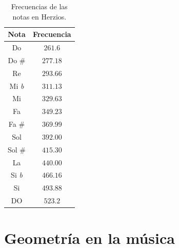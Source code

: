 \documentclass[a4paper, openright, 11pt, titlepage]{report}
\theoremstyle{definition}\newtheorem{defin}[propo]{Definition}
\theoremstyle{definition}\newtheorem{obser}[propo]{Remark}
\theoremstyle{definition}\newtheorem{ejem}[propo]{Ejemplo}
\theoremstyle{definition}\newtheorem{algoritmo}[propo]{Algoritmo}
\begin{document}
\begin{table}[H]
    \centering
    \begin{tabular}{|c|c|}
    \hline
    Nota & Frecuencia\\
    \hline \hline
       Do & $261.6$\\
       Do \# & $277.18$\\
       Re & $293.66$\\
       Mi \textit{b} & $311.13$\\
       Mi & $329.63$\\
       Fa & $349.23$\\
       Fa \# & $369.99$\\
       Sol & $392.00$\\
       Sol \# & $415.30$\\
       La & $440.00$\\
       Si \textit{b} & $466.16$\\
       Si & $493.88$\\
       DO & $523.2$\\
       \hline
    \end{tabular}
    \caption{Frecuencias de las notas en Herzios.}
\end{table}

\chapter{Geometría en la música}
\end{document}
